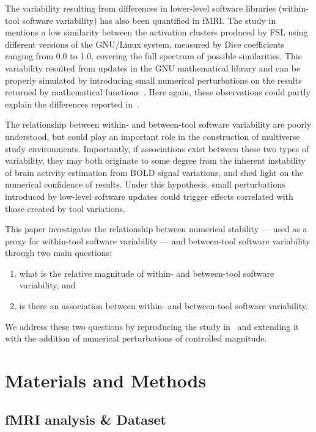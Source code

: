 The variability resulting from differences in lower-level software
libraries (within-tool software variability) has also been quantified in fMRI. The
study in~\cite{Glatard2015} mentions a low similarity between the activation clusters
produced by FSL using different versions of the GNU/Linux system, measured
by Dice coefficients ranging from 0.0 to 1.0, covering the full spectrum of
possible similarities. This variability resulted from updates in the GNU
mathematical library and can be properly simulated by introducing small
numerical perturbations on the results returned by mathematical functions~\cite{salari2021accurate}.
Here again, these observations could partly explain the differences
reported in~\cite{botvinik2020variability}.

The relationship between within- and between-tool software variability are poorly
understood, but could play an important role in the construction of
multiverse study environments. Importantly, if associations exist between
these two types of variability, they may both originate to some degree from
the inherent instability of brain activity estimation from BOLD signal
variations, and shed light on the numerical confidence of results. Under
this hypothesis, small perturbations introduced by low-level software
updates could trigger effects correlated with those created by tool
variations.

This paper investigates the relationship between numerical stability --- used
as a proxy for within-tool software variability --- and between-tool software variability
through two main questions:
\begin{enumerate}
\item what is the relative magnitude of within- and between-tool software variability, and
\item is there an association between within- and between-tool software variability.
\end{enumerate}

We address these two questions by reproducing the study in~\cite{bowring2019exploring} and
extending it with the addition of numerical perturbations of controlled
magnitude.

\section{Materials and Methods}

\subsection{fMRI analysis \& Dataset}

